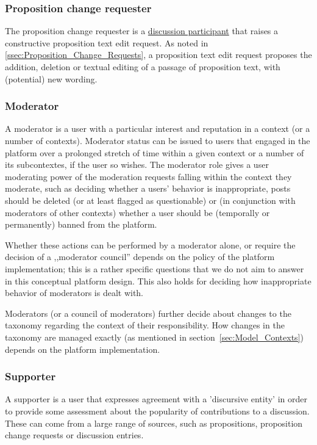 \subsubsection{Proposition change requester}
The proposition change requester is a \hyperref[ssec:Roles_DiscussionParticipant]{discussion participant} that raises a constructive proposition text edit request. 
As noted in \ref{ssec:Proposition_Change_Requests}, a proposition text edit request proposes the addition, deletion or textual editing of a passage of proposition text, with (potential) new wording.

\subsubsection{Moderator}
\label{ssec:Roles_Moderator}
A moderator is a user with a particular interest and reputation in a context (or a number of contexts).
Moderator status can be issued to users that engaged in the platform over a prolonged stretch of time within a given context or a number of its subcontextes, if the user so wishes.
The moderator role gives a user moderating power of the moderation requests falling within the context they moderate, such as deciding whether a users' behavior is inappropriate, posts should be deleted (or at least flagged as questionable) or (in conjunction with moderators of other contexts) whether a user should be (temporally or permanently) banned from the platform.

Whether these actions can be performed by a moderator alone, or require the decision of a ,,moderator council'' depends on the policy of the platform implementation; this is a rather specific questions that we do not aim to answer in this conceptual platform design.
This also holds for deciding how inappropriate behavior of moderators is dealt with.

Moderators (or a council of moderators) further decide about changes to the taxonomy regarding the context of their responsibility.
How changes in the taxonomy are managed exactly (as mentioned in section~\ref{sec:Model_Contexts}) depends on the platform implementation.

\subsubsection{Supporter}
\label{ssec:Roles_Supporter}
A supporter is a user that expresses agreement with a 'discursive entity' in order to provide some assessment about the popularity of contributions to a discussion.
These can come from a large range of sources, such as propositions, proposition change requests or discussion entries. 

